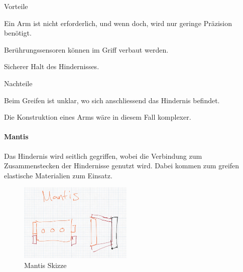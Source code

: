 \documentclass[../main.tex]{subfiles}
\begin{document}
\begin{minipage}[t]{0.48\textwidth}
    \begin{items}
          \item [Vorteile]
          \item Ein Arm ist nicht erforderlich, und wenn doch, wird nur geringe Präzision benötigt.
          \item Berührungssensoren können im Griff verbaut werden.
          \item Sicherer Halt des Hindernisses.
    \end{items}
\end{minipage}
\hfill
\begin{minipage}[t]{0.48\textwidth}
    \begin{items}
          \item [Nachteile]
          \item Beim Greifen ist unklar, wo sich anschliessend das Hindernis befindet.
          \item Die Konstruktion eines Arms wäre in diesem Fall komplexer.
    \end{items}
\end{minipage}
\newpage
\paragraph{Mantis}
Das Hindernis wird seitlich gegriffen, wobei die Verbindung zum Zusammenstecken der Hindernisse genutzt wird. Dabei kommen zum greifen elastische Materialien zum Einsatz.

\begin{figure}[h!]
        \centering
        \includegraphics[width=0.48\textwidth]{img/technologierecherche/Aufnahme/Mantis.jpg}
        \caption{Mantis Skizze}
        \label{img:tech_Mantis}
\end{figure}
\end{document}
